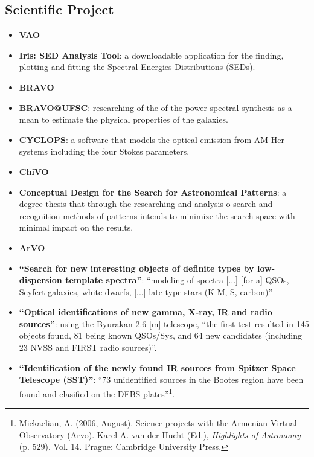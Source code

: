 
\subsection{Scientific Project}
\begin{itemize}
\item \textbf{VAO}
\item \textbf{Iris: SED Analysis Tool}:
a downloadable application for the finding, plotting and fitting the Spectral
Energies Distributions (SEDs). 

\item \textbf{BRAVO}
\item \textbf{BRAVO@UFSC}:
researching of the of the power spectral synthesis as a mean to estimate the
physical properties of the galaxies.

\item \textbf{CYCLOPS}:
a software that models the optical emission from AM Her systems including the
four Stokes parameters.

\item \textbf{ChiVO}
\item  \textbf{Conceptual Design for the Search for Astronomical Patterns}:
 a degree thesis that through the researching and analysis o search and
recognition methods of patterns intends to minimize the search space with
minimal impact on the results. 

\item \textbf{ArVO}
\item \textbf{``Search for new interesting objects of definite types by
low-dispersion template spectra''}:
``modeling of spectra [...] [for a] QSOs, Seyfert galaxies, white dwarfs, [...]
late-type stars (K-M, S, carbon)'' 

\item \textbf{``Optical identifications of new gamma, X-ray, IR and radio
sources''}:
using the Byurakan 2.6 [m] telescope, ``the first test resulted in 145 objects
found, 81 being known QSOs/Sys, and 64 new candidates (including 23 NVSS and
FIRST radio sources)''.

\item \textbf{``Identification of the newly found IR sources from Spitzer Space
Telescope (SST)''}:
``73 unidentified sources in the Bootes region have been found and clasified on
the DFBS plates''\footnote{Mickaelian, A. (2006, August). Science projects with
the Armenian Virtual Observatory (Arvo). Karel A.  van der Hucht (Ed.),
\textit{Highlights of Astronomy} (p. 529). Vol. 14. Prague: Cambridge University
Press.}.


\end{itemize}
